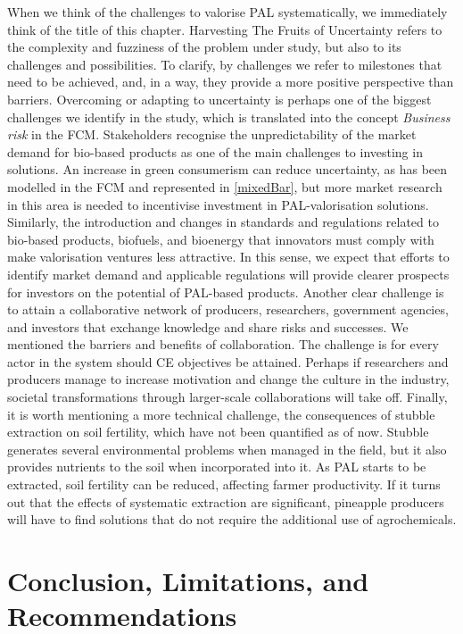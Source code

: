 When we think of the challenges to valorise PAL systematically, we immediately think of the title of this chapter. Harvesting The Fruits of Uncertainty refers to the complexity and fuzziness of the problem under study, but also to its challenges and possibilities. To clarify, by challenges we refer to milestones that need to be achieved, and, in a way, they provide a more positive perspective than barriers. Overcoming or adapting to uncertainty is perhaps one of the biggest challenges we identify in the study, which is translated into the concept \textit{Business risk} in the FCM. Stakeholders recognise the unpredictability of the market demand for bio-based products as one of the main challenges to investing in solutions. An increase in green consumerism can reduce uncertainty, as has been modelled in the FCM and represented in \cref{mixedBar}, but more market research in this area is needed to incentivise investment in PAL-valorisation solutions. Similarly, the introduction and changes in standards and regulations related to bio-based products, biofuels, and bioenergy that innovators must comply with make valorisation ventures less attractive. In this sense, we expect that efforts to identify market demand and applicable regulations will provide clearer prospects for investors on the potential of PAL-based products. Another clear challenge is to attain a collaborative network of producers, researchers, government agencies, and investors that exchange knowledge and share risks and successes. We mentioned the barriers and benefits of collaboration. The challenge is for every actor in the system should CE objectives be attained. Perhaps if researchers and producers manage to increase motivation and change the culture in the industry, societal transformations through larger-scale collaborations will take off. Finally, it is worth mentioning a more technical challenge, the consequences of stubble extraction on soil fertility, which have not been quantified as of now. Stubble generates several environmental problems when managed in the field, but it also provides nutrients to the soil when incorporated into it. As PAL starts to be extracted, soil fertility can be reduced, affecting farmer productivity. If it turns out that the effects of systematic extraction are significant, pineapple producers will have to find solutions that do not require the additional use of agrochemicals. 

\section{Conclusion, Limitations, and Recommendations}

